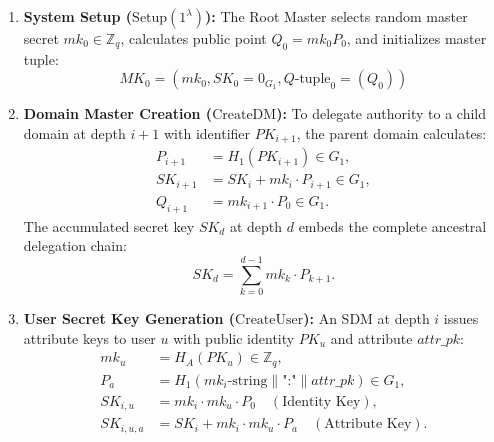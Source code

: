 \documentclass[conference]{IEEEtran}
\begin{document}
\begin{enumerate}
    \item \textbf{System Setup ($\text{Setup}(1^\lambda)$):} The Root Master selects random master secret $mk_0 \in \mathbb{Z}_q$, calculates public point $Q_0 = mk_0 P_0$, and initializes master tuple:
    \begin{equation}
      MK_0 = (mk_0, SK_0 = 0_{G_1}, Q\text{-tuple}_0 = (Q_0))
    \end{equation}
    \item \textbf{Domain Master Creation ($\text{CreateDM}$):} To delegate authority to a child domain at depth $i+1$ with identifier $PK_{i+1}$, the parent domain calculates:
    \begin{align}
      P_{i+1} &= H_1(PK_{i+1}) \in G_1, \\
      SK_{i+1} &= SK_i + mk_i \cdot P_{i+1} \in G_1, \\
      Q_{i+1} &= mk_{i+1} \cdot P_0 \in G_1.
    \end{align}
    The accumulated secret key $SK_d$ at depth $d$ embeds the complete ancestral delegation chain:
    \begin{equation}
      SK_d = \sum_{k=0}^{d-1} mk_k \cdot P_{k+1}.
    \end{equation}
    \item \textbf{User Secret Key Generation ($\text{CreateUser}$):} An SDM at depth $i$ issues attribute keys to user $u$ with public identity $PK_u$ and attribute $attr\_pk$:
    \begin{align}
      mk_u &= H_A(PK_u) \in \mathbb{Z}_q, \\
      P_a &= H_1(mk_i\text{-string} \parallel \text{":"} \parallel attr\_pk) \in G_1, \\
      SK_{i, u} &= mk_i \cdot mk_u \cdot P_0 \quad (\text{Identity Key}), \\
      SK_{i, u, a} &= SK_i + mk_i \cdot mk_u \cdot P_a \quad (\text{Attribute Key}).
    \end{align}
\end{enumerate}
\end{document}
